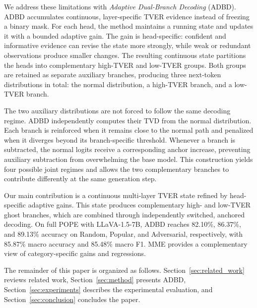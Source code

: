 We address these limitations with \emph{Adaptive Dual-Branch Decoding} (ADBD). ADBD accumulates continuous, layer-specific TVER evidence instead of freezing a binary mask. For each head, the method maintains a running state and updates it with a bounded adaptive gain. The gain is head-specific: confident and informative evidence can revise the state more strongly, while weak or redundant observations produce smaller changes. The resulting continuous state partitions the heads into complementary high-TVER and low-TVER groups. Both groups are retained as separate auxiliary branches, producing three next-token distributions in total: the normal distribution, a high-TVER branch, and a low-TVER branch.

The two auxiliary distributions are not forced to follow the same decoding regime. ADBD independently computes their TVD from the normal distribution. Each branch is reinforced when it remains close to the normal path and penalized when it diverges beyond its branch-specific threshold. Whenever a branch is subtracted, the normal logits receive a corresponding anchor increase, preventing auxiliary subtraction from overwhelming the base model. This construction yields four possible joint regimes and allows the two complementary branches to contribute differently at the same generation step.

Our main contribution is a continuous multi-layer TVER state refined by head-specific adaptive gains. This state produces complementary high- and low-TVER ghost branches, which are combined through independently switched, anchored decoding. On full POPE with LLaVA-1.5-7B, ADBD reaches 82.10\%, 86.37\%, and 89.13\% accuracy on Random, Popular, and Adversarial, respectively, with 85.87\% macro accuracy and 85.48\% macro F1. MME provides a complementary view of category-specific gains and regressions.

The remainder of this paper is organized as follows. Section~\ref{sec:related_work} reviews related work, Section~\ref{sec:method} presents ADBD, Section~\ref{sec:experiments} describes the experimental evaluation, and Section~\ref{sec:conclusion} concludes the paper.
